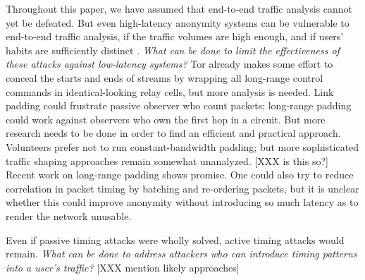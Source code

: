 \documentclass[times,10pt,twocolumn]{article}
\begin{document}
Throughout this paper, we have assumed that end-to-end traffic
analysis cannot yet be defeated.  But even high-latency anonymity
systems can be vulnerable to end-to-end traffic analysis, if the
traffic volumes are high enough, and if users' habits are sufficiently
distinct \cite{limits-open,statistical-disclosure}.  \emph{What can be
  done to limit the effectiveness of these attacks against low-latency
  systems?}  Tor already makes some effort to conceal the starts and
ends of streams by wrapping all long-range control commands in
identical-looking relay cells, but more analysis is needed.  Link
padding could frustrate passive observer who count packets; long-range
padding could work against observers who own the first hop in a
circuit.  But more research needs to be done in order to find an
efficient and practical approach.  Volunteers prefer not to run
constant-bandwidth padding; but more sophisticated traffic shaping
approaches remain somewhat unanalyzed. [XXX is this so?] Recent work
on long-range padding \cite{defensive-dropping} shows promise.  One
could also try to reduce correlation in packet timing by batching and
re-ordering packets, but it is unclear whether this could improve
anonymity without introducing so much latency as to render the
network unusable.

Even if passive timing attacks were wholly solved, active timing
attacks would remain.  \emph{What can
  be done to address attackers who can introduce timing patterns into
  a user's traffic?}  [XXX mention likely approaches]

%
\end{document}
